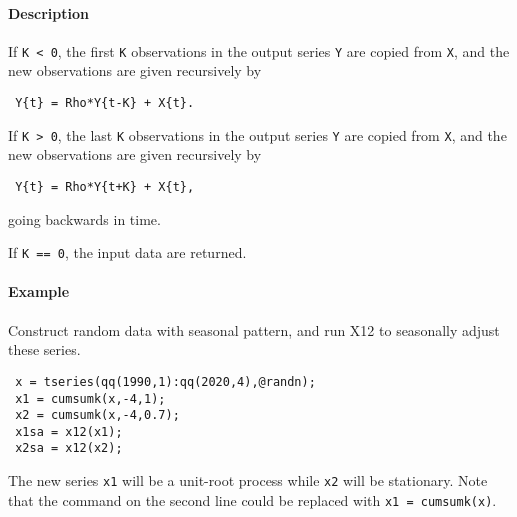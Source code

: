  \paragraph{Description}
 
 If \texttt{K \textless{} 0}, the first \texttt{K} observations in the
 output series \texttt{Y} are copied from \texttt{X}, and the new
 observations are given recursively by
 
 \begin{verbatim}
 Y{t} = Rho*Y{t-K} + X{t}.
 \end{verbatim}
 
 If \texttt{K \textgreater{} 0}, the last \texttt{K} observations in the
 output series \texttt{Y} are copied from \texttt{X}, and the new
 observations are given recursively by
 
 \begin{verbatim}
 Y{t} = Rho*Y{t+K} + X{t},
 \end{verbatim}
 
 going backwards in time.
 
 If \texttt{K == 0}, the input data are returned.
 
 \paragraph{Example}
 
 Construct random data with seasonal pattern, and run X12 to seasonally
 adjust these series.
 
 \begin{verbatim}
 x = tseries(qq(1990,1):qq(2020,4),@randn);
 x1 = cumsumk(x,-4,1);
 x2 = cumsumk(x,-4,0.7);
 x1sa = x12(x1);
 x2sa = x12(x2);
 \end{verbatim}
 
 The new series \texttt{x1} will be a unit-root process while \texttt{x2}
 will be stationary. Note that the command on the second line could be
 replaced with \texttt{x1 = cumsumk(x)}.


